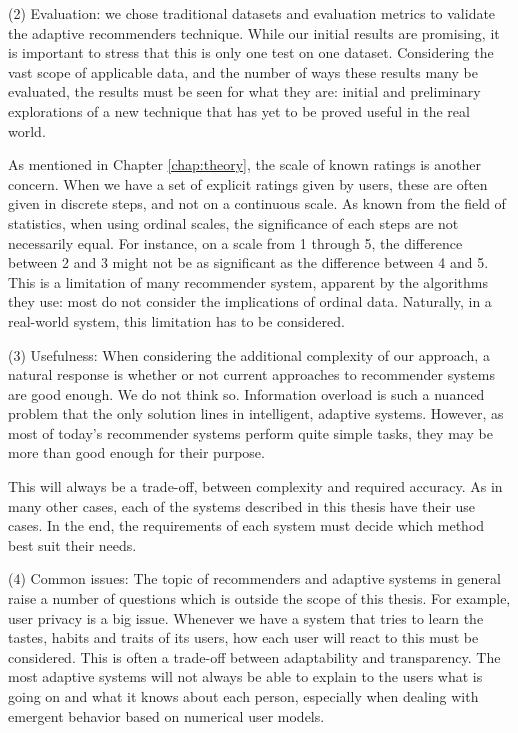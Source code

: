 (2) Evaluation: we chose traditional datasets and evaluation metrics
to validate the adaptive recommenders technique.
While our initial results are promising, it is important to stress
that this is only one test on one dataset. Considering the vast scope
of applicable data, and the number of ways these results many be 
evaluated, the results must be seen for what they are:
initial and preliminary explorations of a new technique
that has yet to be proved useful in the real world.

As mentioned in Chapter \ref{chap:theory}, the scale of known ratings is another concern.
When we have a set of explicit ratings given by users, these are often
given in discrete steps, and not on a continuous scale.
As known from the field of statistics, when using ordinal scales,
the significance of each steps are not necessarily equal.
For instance, on a scale from 1 through 5, the difference
between 2 and 3 might not be as significant as the difference between 4 and 5.
This is a limitation of many recommender system, apparent by the algorithms they use:
most do not consider the implications of ordinal data.
Naturally, in a real-world system, this limitation has to be considered.

(3) Usefulness:
When considering the additional complexity of our approach,
a natural response is whether or not current approaches
to recommender systems are good enough.
We do not think so. Information overload is such a nuanced problem 
that the only solution lines in intelligent, adaptive systems.
However, as most of today's recommender systems 
perform quite simple tasks, they may be more
than good enough for their purpose.

This will always be a trade-off, between complexity and required accuracy.
As in many other cases, each of the systems described in this thesis
have their use cases. In the end, the requirements of each system
must decide which method best suit their needs.

(4) Common issues:
The topic of recommenders and adaptive systems in general
raise a number of questions which is outside the scope of this thesis.
For example, user privacy is a big issue.
Whenever we have a system that tries to learn the tastes, habits and
traits of its users, how each user will react to this must be considered.
This is often a trade-off between adaptability and transparency.
The most adaptive systems will not always be able to explain to the users
what is going on and what it knows about each person,
especially when dealing with emergent behavior based on 
numerical user models.


